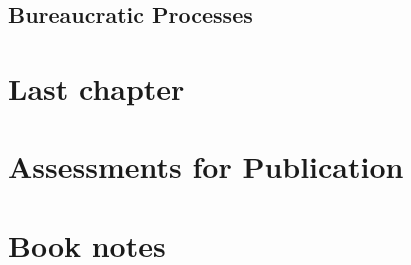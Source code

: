 \documentclass{book}
\begin{document}
%    
%    
  \section{Bureaucratic Processes\label{sec:process}}
    
    
    
    
    
    
    
    
    
  \clearpage

\clearpage
\chapter{Last chapter}





\appendix

\chapter{Assessments for Publication}
\clearpage %
\clearpage  %



\newif\ifbooknotes

\booknotesfalse

\ifbooknotes
\chapter{Book notes}
\clearpage
\clearpage
\clearpage
\clearpage
\clearpage
\clearpage
\clearpage
\clearpage
\clearpage

\end{document}
